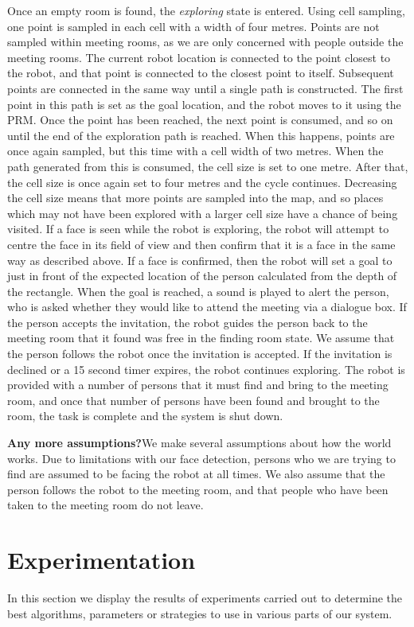 \documentclass[conference]{IEEEtran}
\begin{document}
Once an empty room is found, the \emph{exploring} state is entered. Using cell sampling, one point is sampled in each cell with a width of four metres. Points are not sampled within meeting rooms, as we are only concerned with people outside the meeting rooms. The current robot location is connected to the point closest to the robot, and that point is connected to the closest point to itself. Subsequent points are connected in the same way until a single path is constructed. The first point in this path is set as the goal location, and the robot moves to it using the PRM. Once the point has been reached, the next point is consumed, and so on until the end of the exploration path is reached. When this happens, points are once again sampled, but this time with a cell width of two metres. When the path generated from this is consumed, the cell size is set to one metre. After that, the cell size is once again set to four metres and the cycle continues. Decreasing the cell size means that more points are sampled into the map, and so places which may not have been explored with a larger cell size have a chance of being visited. If a face is seen while the robot is exploring, the robot will attempt to centre the face in its field of view and then confirm that it is a face in the same way as described above. If a face is confirmed, then the robot will set a goal to just in front of the expected location of the person calculated from the depth of the rectangle. When the goal is reached, a sound is played to alert the person, who is asked whether they would like to attend the meeting via a dialogue box. If the person accepts the invitation, the robot guides the person back to the meeting room that it found was free in the finding room state. We assume that the person follows the robot once the invitation is accepted. If the invitation is declined or a 15 second timer expires, the robot continues exploring. The robot is provided with a number of persons that it must find and bring to the meeting room, and once that number of persons have been found and brought to the room, the task is complete and the system is shut down.

\textbf{Any more assumptions?}We make several assumptions about how the world works. Due to limitations with our face detection, persons who we are trying to find are assumed to be facing the robot at all times. We also assume that the person follows the robot to the meeting room, and that people who have been taken to the meeting room do not leave.

\section{Experimentation}
In this section we display the results of experiments carried out to determine the best algorithms, parameters or strategies to use in various parts of our system.
\end{document}

